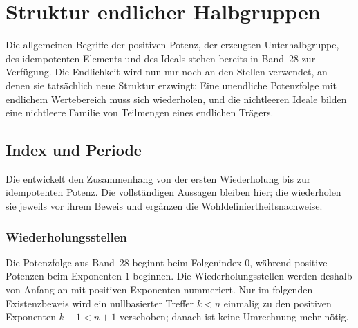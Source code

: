 \documentclass[main.tex]{subfiles}
\begin{document}

\chapter{Struktur endlicher Halbgruppen}

\ProofWideReasonsNearFormula

Die allgemeinen Begriffe der positiven Potenz, der erzeugten
Unterhalbgruppe, des idempotenten Elements und des Ideals stehen bereits in
Band~28 zur Verfügung.  Die Endlichkeit wird nun nur noch an den Stellen
verwendet, an denen sie tatsächlich neue Struktur erzwingt: Eine unendliche
Potenzfolge mit endlichem Wertebereich muss sich wiederholen, und die
nichtleeren Ideale bilden eine nichtleere Familie von Teilmengen eines
endlichen Trägers.

\section{Index und Periode}
\hypertarget{index-period.main}{}

Die \IndexPeriodReadingLink{} entwickelt den Zusammenhang von der ersten
Wiederholung bis zur idempotenten Potenz. Die vollständigen Aussagen
bleiben hier; die \IndexPeriodProofsLink{} wiederholen sie jeweils vor
ihrem Beweis und ergänzen die Wohldefiniertheitsnachweise.

\subsection{Wiederholungsstellen}

Die Potenzfolge aus Band~28 beginnt beim Folgenindex \(0\), während positive
Potenzen beim Exponenten \(1\) beginnen.  Die Wiederholungsstellen werden
deshalb von Anfang an mit positiven Exponenten nummeriert.  Nur im folgenden
Existenzbeweis wird ein nullbasierter Treffer \(k<n\) einmalig zu den
positiven Exponenten \(k+1<n+1\) verschoben; danach ist keine Umrechnung mehr
nötig.

\end{document}
